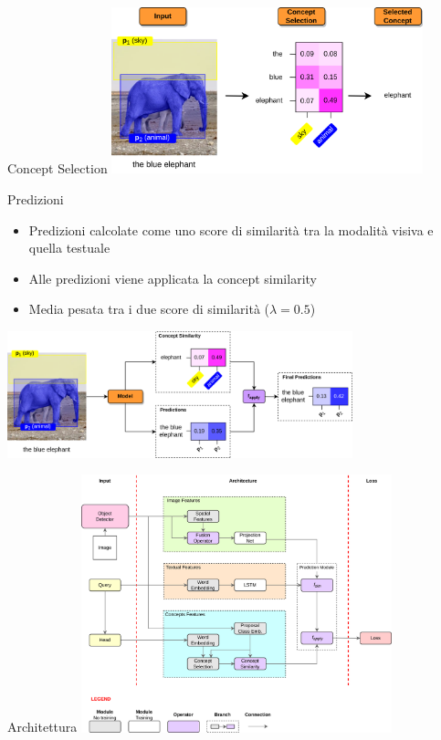 \documentclass{beamer}
\begin{document}
\begin{frame}{Concept Selection}
  \centering
  \includegraphics[width=9cm]{images/concept-selection-example.png}
\end{frame}

\begin{frame}{Predizioni}
  \begin{itemize}
    \item Predizioni calcolate come uno \alert{score di similarità}
    tra la modalità visiva e quella testuale
    \item Alle predizioni viene \alert{applicata} la concept
    similarity
    \item \alert{Media pesata} tra i due score di similarità ($\lambda
    = 0.5$)
  \end{itemize}

  \vspace{0.5cm}

  \centering
  \includegraphics[width=10cm]{images/predictions.png}
\end{frame}

\begin{frame}{Architettura}
  \centering
  \includegraphics[width=9cm]{images/model-architecture.png}
\end{frame}
\end{document}
